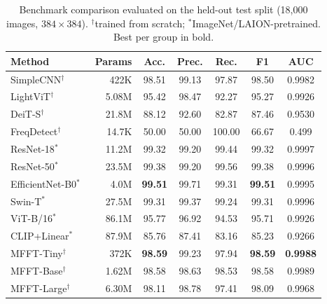 \documentclass[journal]{IEEEtran}
\begin{document}
\begin{table}[!t]
\renewcommand{\arraystretch}{1.2}
\caption{Benchmark comparison evaluated on the held-out test split (18{,}000 images, $384\times384$). $^\dagger$trained from scratch; $^{*}$ImageNet/LAION-pretrained. Best per group in bold.}
\label{tab:main}
\centering
\setlength{\tabcolsep}{3.5pt}
\begin{tabular}{lrccccc}
\toprule
Method & Params & Acc. & Prec. & Rec. & F1 & AUC \\
\midrule
SimpleCNN$^\dagger$      & 422K   & 98.51 & 99.13 & 97.87 & 98.50 & 0.9982 \\
LightViT$^\dagger$       & 5.08M  & 95.42 & 98.47 & 92.27 & 95.27 & 0.9926 \\
DeiT-S$^\dagger$~\cite{touvron2021} & 21.8M  & 88.12 & 92.60 & 82.87 & 87.46 & 0.9530 \\
FreqDetect$^\dagger$~\cite{frank2020} & 14.7K & 50.00 & 50.00 & 100.00 & 66.67 & 0.499 \\
\midrule
ResNet-18$^{*}$~\cite{he2016}    & 11.2M  & 99.32 & 99.20 & 99.44 & 99.32 & 0.9997 \\
ResNet-50$^{*}$~\cite{he2016}    & 23.5M  & 99.38 & 99.20 & 99.56 & 99.38 & 0.9996 \\
EfficientNet-B0$^{*}$~\cite{tan2019} & 4.0M & \textbf{99.51} & 99.71 & 99.31 & \textbf{99.51} & 0.9995 \\
Swin-T$^{*}$~\cite{liu2021}      & 27.5M  & 99.31 & 99.37 & 99.24 & 99.31 & 0.9996 \\
ViT-B/16$^{*}$~\cite{dosovitskiy2021} & 86.1M & 95.77 & 96.92 & 94.53 & 95.71 & 0.9926 \\
CLIP+Linear$^{*}$~\cite{radford2021} & 87.9M & 85.76 & 87.41 & 83.16 & 85.23 & 0.9266 \\
\midrule
MFFT-Tiny$^\dagger$  & 372K  & \textbf{98.59} & 99.23 & 97.94 & \textbf{98.59} & \textbf{0.9988} \\
MFFT-Base$^\dagger$  & 1.62M & 98.58 & 98.63 & 98.53 & 98.58 & 0.9989 \\
MFFT-Large$^\dagger$ & 6.30M & 98.11 & 98.78 & 97.41 & 98.09 & 0.9968 \\
\bottomrule
\end{tabular}
\end{table}
\end{document}
